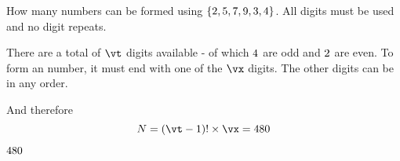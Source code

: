 



\ADD\vc\vd\vt
{}

\question[1] How many \textit{\va} numbers can be formed using $\lbrace 2,5,7,9,3,4 \rbrace$. All digits 
must be used and no digit repeats.

\watchout

\begin{solution}[\mcq]
	There are a total of $\vt$ digits available - of which $4$ are odd and $2$ are even. 
	To form an \textit{\va} number, it must end with one of the $\vx$ \va digits. The other 
	digits can be in any order.
	
	And therefore
  \[ N = (\vt - 1)!\times\vx = \ve \]
\end{solution}

\ifprintanswers
  \begin{codex}
    $480$
  \end{codex}
\fi
